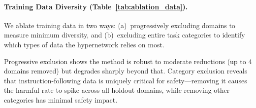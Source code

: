 \documentclass[11pt]{article}
\begin{document}
\begin{table}[t]
\centering
\small
{}
\caption{Component ablation (LLaMA-3, Split~A holdout). $-\mathcal{L}_\text{func}^\text{safe}$: classifier over-blocks safe prompts (accuracy drops). $-$Domain calibration: safety degrades (harmful rate spikes).}
\label{tab:ablation_loss}
\end{table}

\paragraph{Training Data Diversity (Table~\ref{tab:ablation_data}).}
We ablate training data in two ways: (a)~progressively excluding domains to measure minimum diversity, and (b)~excluding entire task categories to identify which types of data the hypernetwork relies on most.

Progressive exclusion shows the method is robust to moderate reductions (up to 4 domains removed) but degrades sharply beyond that. Category exclusion reveals that instruction-following data is uniquely critical for safety---removing it causes the harmful rate to spike across all holdout domains, while removing other categories has minimal safety impact.
\end{document}
